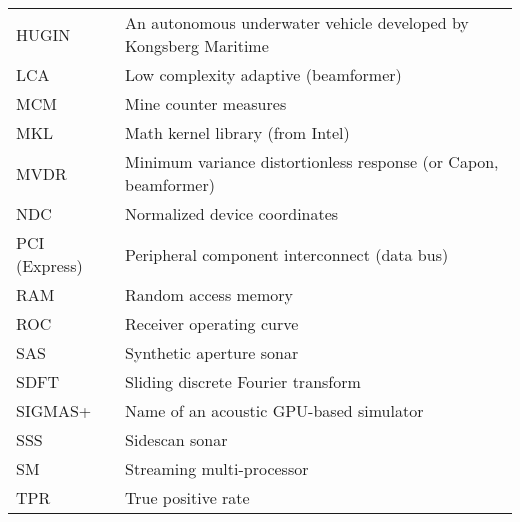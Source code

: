 \begin{longtable}{l l}
	HUGIN            & An autonomous underwater vehicle developed by Kongsberg Maritime          \\
	LCA              & Low complexity adaptive (beamformer)                                      \\
   MCM & Mine counter measures \\
	MKL              & Math kernel library (from Intel)                                          \\
	MVDR             & Minimum variance distortionless response (or Capon, beamformer)           \\
	NDC              & Normalized device coordinates                                             \\
	PCI (Express)    & Peripheral component interconnect (data bus)                              \\
	RAM              & Random access memory                                                      \\
	ROC              & Receiver operating curve                                                  \\
	SAS              & Synthetic aperture sonar                                                  \\
	SDFT             & Sliding discrete Fourier transform                                        \\
	SIGMAS+          & Name of an acoustic GPU-based simulator                                   \\
	SSS              & Sidescan sonar                                                            \\
	SM               & Streaming multi-processor \\
   TPR & True positive rate 
\end{longtable}






